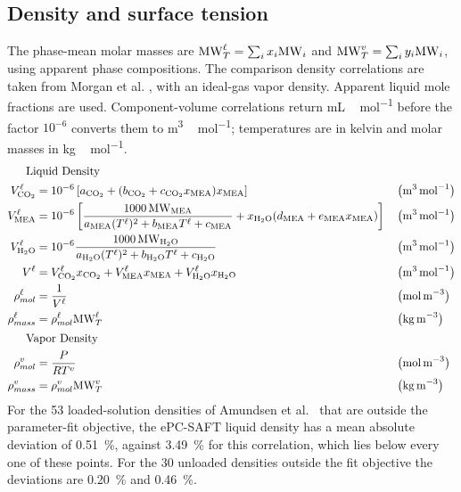 \subsection{Density and surface tension}
The phase-mean molar masses are \(\mathrm{MW}_T^\ell=\sum_i x_i\mathrm{MW}_i\) and \(\mathrm{MW}_T^v=\sum_i y_i\mathrm{MW}_i\), using apparent phase compositions.
The comparison density correlations are taken from Morgan et al. \cite{Morgan2015}, with an ideal-gas vapor density.
Apparent liquid mole fractions are used.
Component-volume correlations return \unit{mL\,mol^{-1}} before the factor $10^{-6}$ converts them to \unit{m^3\,mol^{-1}}; temperatures are in kelvin and molar masses in \unit{kg\,mol^{-1}}.
\begin{align}
\shortintertext{\quad\; Liquid Density}
V^{\liq}_{\COtwo} &=  10^{-6}\left[a_{\COtwo}+(b_{\COtwo}+c_{\COtwo}x_{\MEA})x_{\MEA}\right]
&& \left(\unit{m^{3}\,mol^{-1}}\right)\\
V^{\liq}_{\MEA} &=  10^{-6}\left[\frac{1000\,\text{MW}_{\MEA}}{a_{\MEA} (T^{\liq})^2 + b_{\MEA} T^{\liq} + c_{\MEA}} + x_{\HtwoO}(d_{\MEA}+e_{\MEA}x_{\MEA})\right]
&& \left(\unit{m^{3}\,mol^{-1}}\right)\\
V^{\liq}_{\HtwoO} &=  10^{-6}\frac{1000\,\text{MW}_{\HtwoO}}{a_{\HtwoO} (T^{\liq})^2 + b_{\HtwoO} T^{\liq} + c_{\HtwoO}}
&& \left(\unit{m^{3}\,mol^{-1}}\right)\\
V^{\liq} &= V^{\liq}_{\COtwo}x_{\COtwo} + V^{\liq}_{\MEA}x_{\MEA} + V^{\liq}_{\HtwoO}x_{\HtwoO}
&& \left(\unit{m^{3}\,mol^{-1}}\right)\\
\rho ^{\liq}_{mol} &= \frac{1}{V^{\liq}}
&& \left(\unit{mol\,m^{-3}}\right)\\
\rho ^{\liq}_{mass} &= \rho ^{\liq}_{mol}\text{MW}^{\liq}_{T}
&& \left(\unit{kg\,m^{-3}}\right)\\
\shortintertext{\quad\; Vapor Density}
\rho ^{\vap}_{mol} &= \frac{P}{RT^{\vap}}
&& \left(\unit{mol\,m^{-3}}\right)\\
\rho ^{\vap}_{mass} &= \rho ^{\vap}_{mol}\text{MW}^{\vap}_{T}
&& \left(\unit{kg\,m^{-3}}\right)
\end{align}
For the 53 loaded-solution densities of Amundsen et al.\ \cite{Amundsen2009} that are outside the parameter-fit objective, the ePC-SAFT liquid density has a mean absolute deviation of \qty{0.51}{\percent}, against \qty{3.49}{\percent} for this correlation, which lies below every one of these points.
For the 30 unloaded densities outside the fit objective the deviations are \qty{0.20}{\percent} and \qty{0.46}{\percent}.



